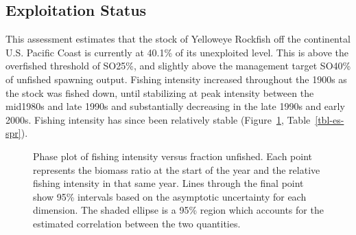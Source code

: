 \documentclass[
]{scrartcl}
\begin{document}
\subsection*{Exploitation Status}\label{exploitation-status}

This assessment estimates that the stock of Yelloweye Rockfish off the
continental U.S. Pacific Coast is currently at 40.1\% of its unexploited
level. This is above the overfished threshold of SO25\%, and slightly
above the management target SO40\% of unfished spawning output. Fishing
intensity increased throughout the 1900s as the stock was fished down,
until stabilizing at peak intensity between the mid1980s and late 1990s
and substantially decreasing in the late 1990s and early 2000s. Fishing
intensity has since been relatively stable (Figure~\ref{fig-es-kobe},
Table~\ref{tbl-es-spr}).

\begin{figure}[H]


\caption{\label{fig-es-kobe}Phase plot of fishing intensity versus
fraction unfished. Each point represents the biomass ratio at the start
of the year and the relative fishing intensity in that same year. Lines
through the final point show 95\% intervals based on the asymptotic
uncertainty for each dimension. The shaded ellipse is a 95\% region
which accounts for the estimated correlation between the two
quantities.}

\end{figure}%
\end{document}
